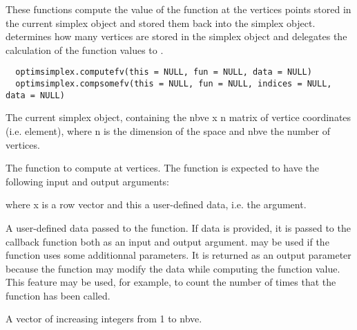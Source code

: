 %
\begin{Description}\relax
These functions compute the value of the function at the vertices points
stored in the current simplex object and stored them back into the simplex
object.  determines how many vertices are stored
in the simplex object and delegates the calculation of the function values to
.
\end{Description}
%
\begin{Usage}
\begin{verbatim}
  optimsimplex.computefv(this = NULL, fun = NULL, data = NULL)
  optimsimplex.compsomefv(this = NULL, fun = NULL, indices = NULL, data = NULL)
\end{verbatim}
\end{Usage}
%
\begin{Arguments}
\begin{ldescription}
\item[\code{this}] The current simplex object, containing the nbve x n matrix of
vertice coordinates (i.e.  element), where n is the
dimension of the space and nbve the number of vertices.
\item[\code{fun}] The function to compute at vertices. The function is expected to
have the following input and output arguments:

where x is a row vector and this a user-defined data, i.e. the  
argument.
\item[\code{data}] A user-defined data passed to the function. If data is provided,
it is passed to the callback function both as an input and output argument.
 may be used if the function uses some additionnal parameters. It
is returned as an output parameter because the function may modify the data
while computing the function value. This feature may be used, for example,
to count the number of times that the function has been called.
\item[\code{indices}] A vector of increasing integers from 1 to nbve.
\end{ldescription}
\end{Arguments}
